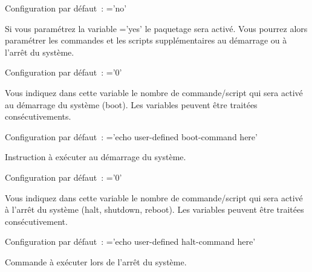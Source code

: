 \begin{description}


        Configuration par défaut~: ='no'

    Si vous paramétrez la variable ='yes' le paquetage sera
    activé. Vous pourrez alors paramétrer les commandes et les scripts
    supplémentaires au démarrage ou à l'arrêt du système.


        Configuration par défaut~: ='0'

    Vous indiquez dans cette variable le nombre de commande/script qui sera
    activé au démarrage du système (boot). Les variables peuvent être traitées
    consécutivements.


        Configuration par défaut~: ='echo user-defined boot-command here'

    Instruction à exécuter au démarrage du système.



        Configuration par défaut~: ='0'

    Vous indiquez dans cette variable le nombre de commande/script qui sera
    activé à l'arrêt du système (halt, shutdown, reboot). Les variables peuvent
    être traitées consécutivement.


        Configuration par défaut~: ='echo user-defined halt-command here'

    Commande à exécuter lors de l'arrêt du système.




\end{description}

